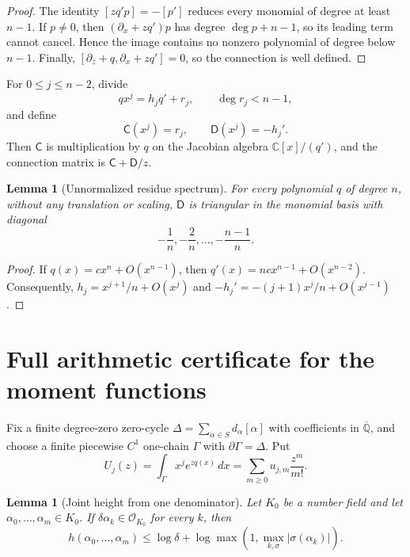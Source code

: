 \documentclass[11pt]{article}
\numberwithin{equation}{section}
\newtheorem{lemma}[theorem]{Lemma}
\theoremstyle{definition}
\theoremstyle{remark}
\newcommand{\C}{\mathbb C}
\newcommand{\Qbar}{\overline{\mathbb Q}}
\begin{document}
\begin{proof}
The identity $[zq'p]=-[p']$ reduces every monomial of degree at least
$n-1$.  If $p\ne0$, then $(\partial_x+zq')p$ has degree
$\deg p+n-1$, so its leading term cannot cancel.  Hence the image contains
no nonzero polynomial of degree below $n-1$.  Finally,
$[\partial_z+q,\partial_x+zq']=0$, so the connection is well defined.
\end{proof}

For $0\le j\le n-2$, divide
\begin{equation}\label{eq:division-toolkit}
  qx^j=h_jq'+r_j,
  \qquad \deg r_j<n-1,
\end{equation}
and define
\[
  \mathsf C(x^j)=r_j,
  \qquad
  \mathsf D(x^j)=-h_j'.
\]
Then $\mathsf C$ is multiplication by $q$ on the Jacobian algebra
$\C[x]/(q')$, and the connection matrix is
$\mathsf C+\mathsf D/z$.

\begin{lemma}[Unnormalized residue spectrum]\label{lem:unnormalized-D}
For every polynomial $q$ of degree $n$, without any translation or scaling,
$\mathsf D$ is triangular in the monomial basis with diagonal
\[
  -\frac1n,-\frac2n,\ldots,-\frac{n-1}{n}.
\]
\end{lemma}

\begin{proof}
If $q(x)=cx^n+O(x^{n-1})$, then $q'(x)=ncx^{n-1}+O(x^{n-2})$.
Consequently,
$h_j=x^{j+1}/n+O(x^j)$ and
$-h_j'=-(j+1)x^j/n+O(x^{j-1})$.
\end{proof}

\section{Full arithmetic certificate for the moment functions}
\label{sec:height}

Fix a finite degree-zero zero-cycle
$\Delta=\sum_{\alpha\in S}d_\alpha[\alpha]$ with coefficients in $\Qbar$,
and choose a finite piecewise $C^1$ one-chain $\Gamma$ with
$\partial\Gamma=\Delta$.  Put
\[
  U_j(z)=\int_\Gamma x^j e^{zq(x)}\,dx
  =\sum_{m\ge0}u_{j,m}\frac{z^m}{m!}.
\]

\begin{lemma}[Joint height from one denominator]\label{lem:joint-height}
Let $K_0$ be a number field and let
$\alpha_0,\ldots,\alpha_m\in K_0$.  If
$\delta\alpha_k\in\mathcal O_{K_0}$ for every $k$, then
\[
 h(\alpha_0,\ldots,\alpha_m)
 \le \log\delta+
 \log\max\left(1,\max_{k,\sigma}|\sigma(\alpha_k)|\right).
\]
\end{lemma}
\end{document}
